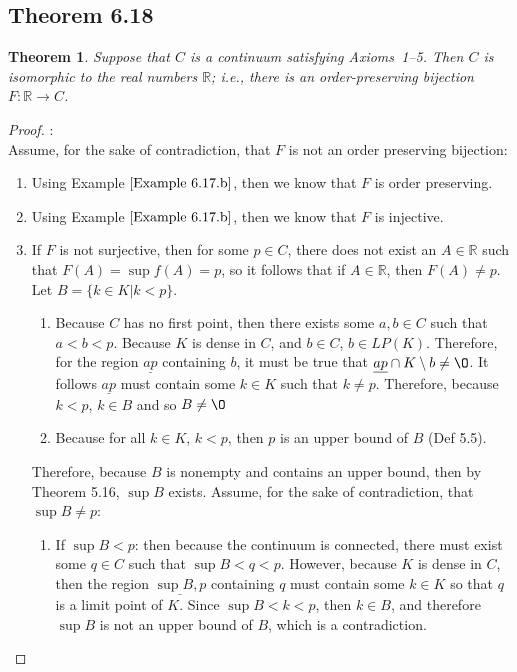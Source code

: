 \documentclass[openany, amssymb, psamsfonts]{amsart}
\newcommand{\bbR}{\mathbb{R}}
\renewcommand{\emptyset}{\O}
\newcommand{\sm}{\setminus}
\newcommand{\arr}{\longrightarrow}
\newtheorem{thm}{Theorem}[section]
\theoremstyle{definition}
\numberwithin{equation}{section}
\begin{document}
\subsection*{Theorem 6.18}
\begin{thm}
\label {6.18}
	Suppose that $C$ is a continuum satisfying Axioms~1--5. Then $C$ is isomorphic to the real numbers $\bbR$; i.e.,
	there is an order-preserving bijection $F\colon \bbR \arr C$.
	\label{thm:Axioms 1-5 isomorphic to real numbers}
\end{thm}
\begin{proof}:\\
Assume, for the sake of contradiction, that $F$ is not an order preserving bijection:
\begin{enumerate}
    \item Using Example $\ref{Example 6.17.b}$, then we know that $F$ is order preserving.
    \item Using Example $\ref{Example 6.17.b}$, then we know that $F$ is injective.
    \item If $F$ is not surjective, then for some $p \in C$, there does not exist an $A\in \bbR$ such that $F(A) = \sup f(A) = p$, so it follows that if $A\in \bbR$, then $F(A) \neq p$.\\ Let $B = \{k\in K | k<p\}$.
    \begin{enumerate}
    \item Because $C$ has no first point, then there exists some $a,b\in C$ such that $a<b<p$. Because $K$ is dense in $C$, and $b\in C$, $b\in LP(K)$. Therefore, for the region $\underline{ap}$ containing $b$, it must be true that $\underline{ap}\cap K\sm{b} \neq \emptyset$. It follows $\underline{ap}$ must contain some $k\in K$ such that $k\neq p$. Therefore, because $k<p$, $k\in B$ and so $B\neq \emptyset$
    \item Because for all $k\in K$, $k<p$, then $p$ is an upper bound of $B$ (Def 5.5). 
    \end{enumerate}
    Therefore, because $B$ is nonempty and contains an upper bound, then by Theorem 5.16, $\sup B$ exists. Assume, for the sake of contradiction, that $\sup B \neq p$:
    \begin{enumerate}
    \item If $\sup B <p$: then because the continuum is connected, there must exist some $q\in C$ such that $\sup B <q<p$. However, because $K$ is dense in $C$, then the region $\underline{\sup B,p}$ containing $q$ must contain some $k\in K$ so that $q$ is a limit point of $K$. Since $\sup B < k < p$, then $k\in B$, and therefore $\sup B$ is not an upper bound of $B$, which is a contradiction.

\end{enumerate}
\end{enumerate}
\end{proof}
\end{document}
